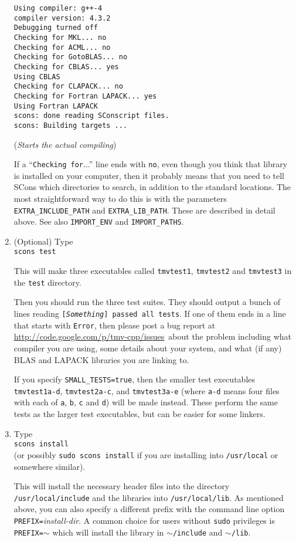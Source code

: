 \documentclass[twoside,letterpaper,11pt]{article}
\newcommand{\myissuesx}{http://code.google.com/p/tmv-cpp/issues}
\newcommand{\myissues}{\url{\myissuesx}}
\renewcommand{\tt}[1]{{\lstinline {#1}}}
\begin{document}
\begin{enumerate}
\begin{verbatim}
Using compiler: g++-4
compiler version: 4.3.2
Debugging turned off
Checking for MKL... no
Checking for ACML... no
Checking for GotoBLAS... no
Checking for CBLAS... yes
Using CBLAS
Checking for CLAPACK... no
Checking for Fortran LAPACK... yes
Using Fortran LAPACK
scons: done reading SConscript files.
scons: Building targets ...
\end{verbatim}
\vspace{-8pt}(\emph{Starts the actual compiling})

If a ``\texttt{Checking for}...'' line ends with \texttt{no}, even though you think that library is installed
on your computer, then it probably means that you need to tell SCons which directories
to search, in addition to the standard locations.  The most straightforward way to do this is
with the parameters \texttt{EXTRA\_INCLUDE\_PATH} and \texttt{EXTRA\_LIB\_PATH}.  
These are described in detail above.  See also \texttt{IMPORT\_ENV} and \texttt{IMPORT\_PATHS}.

\item (Optional) Type\\
\texttt{scons test}

This will make three executables called \texttt{tmvtest1}, 
\texttt{tmvtest2} and \texttt{tmvtest3} in the \texttt{test} directory.

Then you should run the three test suites.
They should output a bunch of lines reading \texttt{[{\em Something}] passed all tests}.
If one of them ends in a line that starts with \texttt{Error}, 
then please post a bug report at \myissues\ about the problem including what compiler
you are using, some details about your system, and what (if any) BLAS and LAPACK
libraries you are linking to.

If you specify \texttt{SMALL\_TESTS=true}, then the smaller test executables
\texttt{tmvtest1a-d}, \texttt{tmvtest2a-c}, and \texttt{tmvtest3a-e} (where \tt{a-d} means 
four files with each of \tt{a}, \tt{b}, \tt{c} and \tt{d})
will be made instead.
These perform the same tests as the larger test executables, but can be easier
for some linkers.

\item Type\\
\texttt{scons install}\\
(or possibly \tt{sudo scons install} if you are installing into \tt{/usr/local} or somewhere similar).

This will install the necessary header files into the directory \texttt{/usr/local/include} and the libraries
into \texttt{/usr/local/lib}.  As mentioned above, you can also specify a different prefix 
with the command line option \texttt{PREFIX=}\emph{install-dir}.  A common choice for users
without \texttt{sudo} privileges is \texttt{PREFIX=$\sim$} which will install the library in \texttt{$\sim$/include}
and \texttt{$\sim$/lib}.


\end{enumerate}
\end{document}
